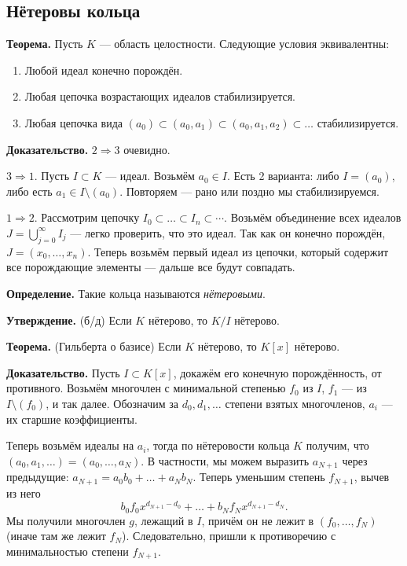\subsection{Нётеровы кольца}
\textbf{Теорема.} Пусть $K$ --- область целостности.
Следующие условия эквивалентны:
\begin{enumerate}
    \item Любой идеал конечно порождён.
    \item Любая цепочка возрастающих идеалов стабилизируется.
    \item Любая цепочка вида $(a_0) \subset (a_0, a_1) \subset (a_0, a_1, a_2) \subset \dots$ стабилизируется.
\end{enumerate}

\textbf{Доказательство.} $2 \Rightarrow 3$ очевидно. 

$3 \Rightarrow 1$. Пусть $I \subset K$ --- идеал.
Возьмём $a_0 \in I$. Есть 2 варианта: либо $I = (a_0)$, либо есть $a_1 \in I \setminus (a_0)$.
Повторяем --- рано или поздно мы стабилизируемся.


$1 \Rightarrow 2$. Рассмотрим цепочку $I_0 \subset \dots \subset I_n \subset \cdots$.
Возьмём объединение всех идеалов $J = \bigcup_{j=0}^{\infty} I_j$ --- легко проверить, что это идеал.
Так как он конечно порождён, $J = (x_0, \dots, x_n)$.
Теперь возьмём первый идеал из цепочки, который содержит все порождающие элементы --- дальше все будут совпадать.

\QED

\textbf{Определение.} Такие кольца называются \textit{нётеровыми}.

\textbf{Утверждение.} (б/д) Если $K$ нётерово, то $K/I$ нётерово.

\textbf{Теорема.} (Гильберта о базисе) Если $K$ нётерово, то $K[x]$ нётерово.

\textbf{Доказательство.} Пусть $I \subset K[x]$, докажём его конечную порождённость, от противного.
Возьмём многочлен с минимальной степенью $f_0$ из $I$, $f_1$ --- из $I \setminus (f_0)$, и так далее.
Обозначим за $d_0, d_1, \dots$ степени взятых многочленов, $a_i$ --- их старшие коэффициенты.

Теперь возьмём идеалы на $a_i$, тогда по нётеровости кольца $K$ получим, что $(a_0, a_1, \dots) = (a_0, \dots, a_N)$.
В частности, мы можем выразить $a_{N+1}$ через предыдущие: $a_{N+1} = a_0 b_0 + \dots + a_N b_N$.
Теперь уменьшим степень $f_{N+1}$, вычев из него
\[
    b_0 f_0 x^{d_{N+1} - d_0} + \dots + b_N f_N x^{d_{N+1} - d_N}.
\]
Мы получили многочлен $g$, лежащий в $I$, причём он не лежит в $(f_0, \dots, f_N)$ (иначе там же лежит $f_N$).
Следовательно, пришли к противоречию с минимальностью степени $f_{N+1}$.


